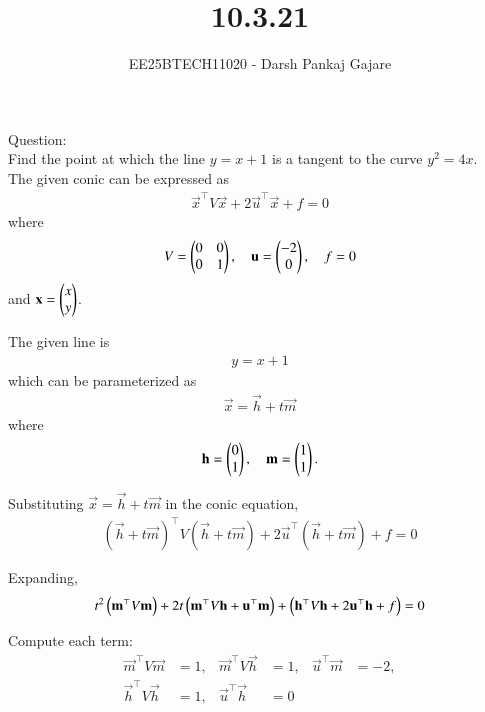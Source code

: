 \documentclass[journal,12pt,onecolumn]{IEEEtran}
\begin{document}
\title{10.3.21}
\author{EE25BTECH11020 - Darsh Pankaj Gajare}
{\let\newpage\relax\maketitle}

Question:\\
Find the point at which the line $y=x+1$ is a tangent to the curve $y^2=4x$.\\
\solution
The given conic can be expressed as
\begin{align}
\vec{x}^\top V\vec{x} + 2\vec{u}^\top\vec{x} + f = 0
\end{align}
where
\begin{align}
V = \begin{pmatrix}0 & 0 \\ 0 & 1\end{pmatrix}, \quad
\mathbf{u} = \begin{pmatrix}-2 \\ 0\end{pmatrix}, \quad
f = 0
\end{align}
and $\mathbf{x} = \begin{pmatrix}x \\ y\end{pmatrix}$.

The given line is 
\begin{align}
y = x + 1
\end{align}
which can be parameterized as
\begin{align}
\vec{x} = \vec{h} + t\vec{m}
\end{align}
where
\begin{align}
\mathbf{h} = \begin{pmatrix}0 \\ 1\end{pmatrix}, \quad
\mathbf{m} = \begin{pmatrix}1 \\ 1\end{pmatrix}.
\end{align}

Substituting $\vec{x} = \vec{h} + t\vec{m}$ in the conic equation,
\begin{align}
(\vec{h} + t\vec{m})^\top V (\vec{h} + t\vec{m})
+ 2\vec{u}^\top (\vec{h} + t\vec{m}) + f = 0
\end{align}

Expanding,
\begin{align}
t^2\left(\mathbf{m}^\top V\mathbf{m}\right) 
+ 2t\left(\mathbf{m}^\top V\mathbf{h} + \mathbf{u}^\top\mathbf{m}\right) 
+ \left(\mathbf{h}^\top V\mathbf{h} + 2\mathbf{u}^\top\mathbf{h} + f\right) = 0
\end{align}

Compute each term:
\begin{align}
\vec{m}^\top V\vec{m} &= 1, &
\vec{m}^\top V\vec{h} &= 1, &
\vec{u}^\top\vec{m} &= -2, \\
\vec{h}^\top V\vec{h} &= 1, &
\vec{u}^\top\vec{h} &= 0
\end{align}
\end{document}
